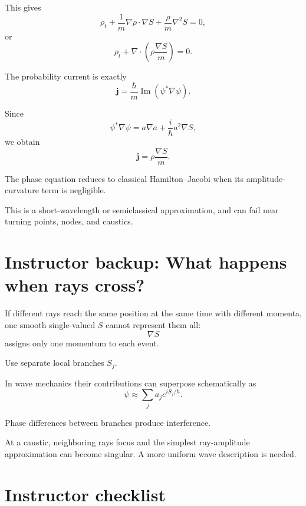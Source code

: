 \documentclass[11pt,a4paper]{article}
\begin{document}
This gives
\[
\rho_t
+
\frac1m\nabla\rho\cdot\nabla S
+
\frac\rho m\nabla^2S
=
0,
\]
or
\[
\boxed{
\rho_t+
\nabla\cdot
\left(
\rho\frac{\nabla S}{m}
\right)
=0.
}
\]

The probability current is exactly
\[
\mathbf j
=
\frac\hbar m
\operatorname{Im}(\psi^*\nabla\psi).
\]

Since
\[
\psi^*\nabla\psi
=
a\nabla a
+
\frac i\hbar a^2\nabla S,
\]
we obtain
\[
\boxed{
\mathbf j
=
\rho\frac{\nabla S}{m}.
}
\]

The phase equation reduces to classical Hamilton--Jacobi
when its amplitude-curvature term is negligible.

This is a short-wavelength or semiclassical approximation,
and can fail near turning points, nodes, and caustics.

\section*{Instructor backup: What happens when rays cross?}

If different rays reach the same position at the same
time with different momenta, one smooth single-valued
\(S\) cannot represent them all:
\[
\nabla S
\]
assigns only one momentum to each event.

Use separate local branches \(S_j\).

In wave mechanics their contributions can superpose
schematically as
\[
\psi
\approx
\sum_j a_j e^{iS_j/\hbar}.
\]

Phase differences between branches produce interference.

At a caustic, neighboring rays focus and the simplest
ray-amplitude approximation can become singular.
A more uniform wave description is needed.

\section*{Instructor checklist}
\end{document}

